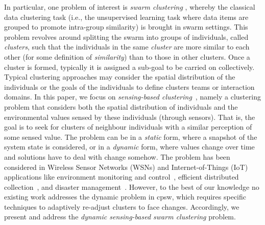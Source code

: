 In particular, one problem of interest is \emph{swarm clustering} \cite{DBLP:conf/smc/LeeKK05,DBLP:journals/asc/CruzNM17},
 whereby the classical data clustering task
 (i.e., the unsupervised learning task where data items are grouped to promote intra-group similarity)
 is brought in swarm settings.
%
This problem revolves around splitting the swarm
 into groups of individuals, called \emph{clusters},
 such that the individuals in the same \emph{cluster}
 are more similar to each other (for some definition of \emph{similarity}) than to those in other clusters.
%
Once a cluster is formed, typically it is assigned a sub-goal to be carried on collectively.
%
Typical clustering approaches may consider
 the spatial distribution of the individuals
 or the goals of the individuals to define clusters
  teams or interaction domains.
%
In this paper, we focus on \emph{sensing-based clustering}~\cite{DBLP:conf/ccnc/LinM07}, namely
 a clustering problem
 that considers both the spatial distribution of individuals
 and the environmental values sensed by these individuals (through sensors).
%
That is, the goal is to seek for clusters of neighbour individuals with a similar perception of some sensed value.
%
The problem can be in a \emph{static} form,
 where a snapshot of the system state is considered,
 or in a \emph{dynamic} form,
 where values change over time
 and solutions have to deal with change somehow.
%
The problem has been considered in Wireless Sensor Networks (WSNs) and Internet-of-Things (IoT) applications like
  environment monitoring and control~\cite{DBLP:conf/ccnc/LinM07},
  efficient distributed collection~\cite{DBLP:journals/ijcomsys/PhamLPC10},
  and disaster management~\cite{DBLP:journals/jaihc/KucukBSK20}.
%
However, to the best of our knowledge no existing work addresses the dynamic problem in \ac{cpsw}, which requires specific
techniques to adaptively re-adjust clusters to face changes.
%
%
Accordingly, we present and address the \emph{dynamic sensing-based swarm clustering} problem.
%

